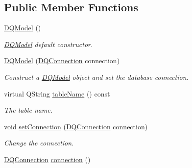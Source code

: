\subsection*{Public Member Functions}
\begin{DoxyCompactItemize}
\item 
\hyperlink{classDQModel_a98155a41ca77a21f7c897255c8419c8d}{DQModel} ()
\begin{DoxyCompactList}\small\item\em \hyperlink{classDQModel}{DQModel} default constructor. \item\end{DoxyCompactList}\item 
\hypertarget{classDQModel_aadeafc9b34a68ee9242b53b42e4f58f9}{
\hyperlink{classDQModel_aadeafc9b34a68ee9242b53b42e4f58f9}{DQModel} (\hyperlink{classDQConnection}{DQConnection} connection)}
\label{classDQModel_aadeafc9b34a68ee9242b53b42e4f58f9}

\begin{DoxyCompactList}\small\item\em Construct a \hyperlink{classDQModel}{DQModel} object and set the database connection. \item\end{DoxyCompactList}\item 
\hypertarget{classDQModel_a1d4cb3f088c2817587bce92f08ee66fd}{
virtual QString \hyperlink{classDQModel_a1d4cb3f088c2817587bce92f08ee66fd}{tableName} () const }
\label{classDQModel_a1d4cb3f088c2817587bce92f08ee66fd}

\begin{DoxyCompactList}\small\item\em The table name. \item\end{DoxyCompactList}\item 
\hypertarget{classDQModel_aa11d33a6e369492497a81e5506cef3a1}{
void \hyperlink{classDQModel_aa11d33a6e369492497a81e5506cef3a1}{setConnection} (\hyperlink{classDQConnection}{DQConnection} connection)}
\label{classDQModel_aa11d33a6e369492497a81e5506cef3a1}

\begin{DoxyCompactList}\small\item\em Change the connection. \item\end{DoxyCompactList}\item 
\hypertarget{classDQModel_ab5ff5bc7dbb32397751d8671e409c900}{
\hyperlink{classDQConnection}{DQConnection} \hyperlink{classDQModel_ab5ff5bc7dbb32397751d8671e409c900}{connection} ()}
\label{classDQModel_ab5ff5bc7dbb32397751d8671e409c900}


\end{DoxyCompactItemize}
